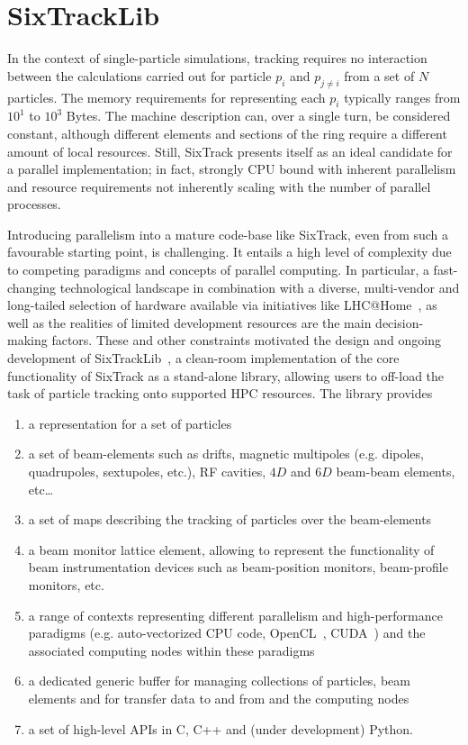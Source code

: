 \documentclass[a4paper,
              ]{jacow}
\begin{document}
\section{SixTrackLib}
In the context of single-particle simulations, tracking requires no interaction between the calculations carried out for particle $p_i$ and $p_{j\neq i}$ from a set of $N$ 
particles. The memory requirements for representing each $p_i$ typically ranges from $10^1$ to $10^3$ Bytes. The machine description can, over a single turn, be considered 
constant, although different elements and sections of the ring require a different amount of local resources. Still, SixTrack presents itself as an ideal candidate for a 
parallel implementation; in fact, strongly CPU bound with inherent parallelism and resource requirements not inherently scaling with the number of parallel processes. 

Introducing parallelism into a mature code-base like SixTrack, even from such a favourable starting point, is challenging. It entails a high level of complexity due to 
competing paradigms and concepts of parallel computing. In particular, a fast-changing technological landscape in combination with a diverse, multi-vendor and long-tailed 
selection of hardware available via initiatives like LHC@Home~\cite{lhcathome}, as well as the realities of limited development resources are the main decision-making factors. 
These and other constraints motivated the design and ongoing development of SixTrackLib~\cite{sixtracklib}, a clean-room implementation of the core functionality of SixTrack as
a stand-alone library, allowing users to off-load the task of particle tracking onto supported HPC resources. The library provides 
\begin{enumerate}[label=(\alph*)]
 \item a representation for a set of particles 
 \item a set of beam-elements such as drifts, magnetic multipoles (e.g. dipoles, quadrupoles, sextupoles, etc.), RF cavities, $4D$ and $6D$ beam-beam elements, etc\ldots 
 \item a set of maps describing the tracking of particles over the beam-elements
 \item a beam monitor lattice element, allowing to represent the functionality of beam instrumentation devices such as beam-position monitors, beam-profile monitors, etc.
 \item a range of contexts representing different parallelism and high-performance paradigms (e.g. auto-vectorized CPU code, OpenCL~\cite{opencl}, CUDA~\cite{cuda}) and the 
       associated computing nodes within these paradigms
 \item a dedicated generic buffer for managing collections of particles, beam elements and for transfer data to and from and the computing nodes 
 \item a set of high-level APIs in C, C++ and (under development) Python.
\end{enumerate}
\end{document}
